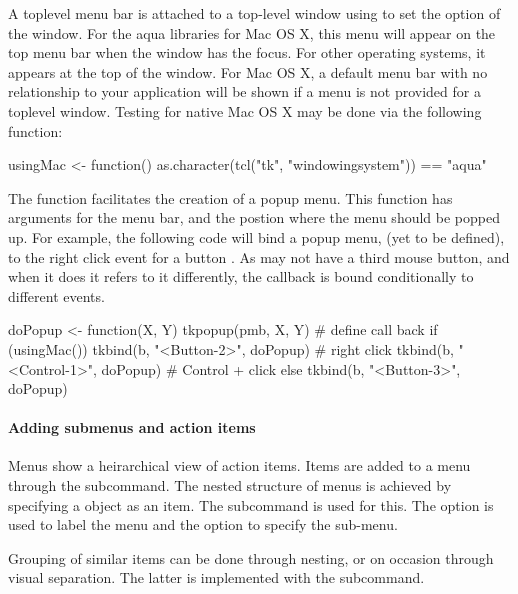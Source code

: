 A toplevel menu bar is attached to a top-level window using 
to set the  option of the window. For the aqua \TK\/
libraries for Mac OS X, this menu will appear on the top menu bar when
the window has the focus. For other operating systems, it appears at
the top of the window. For Mac OS X, a default menu bar with no
relationship to your application will be shown if a menu is not
provided for a toplevel window. Testing for native Mac OS X may be done via
the following function:
\begin{Schunk}
\begin{Sinput}
 usingMac <- function()  
   as.character(tcl("tk", "windowingsystem")) == "aqua"
\end{Sinput}
\end{Schunk}

The  function facilitates the creation of a popup
menu.  This function has arguments for the menu bar, and the postion
where the menu should be popped up. For example, the following code
will bind a popup menu,  (yet to be defined), to the right click event for a
button . As \OSX\/ may not have a third mouse button, and when
it does it refers to it differently, the callback is bound
conditionally to different events.


\begin{Schunk}
\begin{Sinput}
 doPopup <- function(X, Y) tkpopup(pmb, X, Y) # define call back
 if (usingMac()) {
   tkbind(b, "<Button-2>", doPopup)      # right click
   tkbind(b, "<Control-1>", doPopup)     # Control + click
 } else {
   tkbind(b, "<Button-3>", doPopup)
 }
\end{Sinput}
\end{Schunk}


\paragraph{Adding submenus and action items}
Menus show a heirarchical view of action items. Items are added to a
menu through the  subcommand.  The nested
structure of menus is achieved by specifying a  object as
an item. The  subcommand is used for
this. The option  is used to label the menu and the
 option to specify the sub-menu.

Grouping of similar items can be done through nesting, or on occasion
through visual separation. The latter is implemented with the  subcommand.


